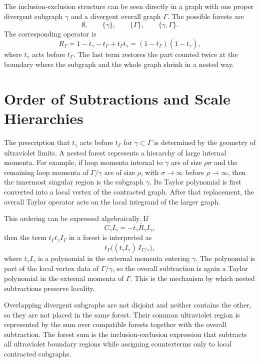 The inclusion-exclusion structure can be seen directly in a graph with one
proper divergent subgraph \(\gamma\) and a divergent overall graph \(\Gamma\).
The possible forests are
\[
  \emptyset,\qquad
  \{\gamma\},\qquad
  \{\Gamma\},\qquad
  \{\gamma,\Gamma\}.
\]
The corresponding operator is
\[
  R_\Gamma
  =
  1-t_\gamma-t_\Gamma+t_\Gamma t_\gamma
  =
  (1-t_\Gamma)(1-t_\gamma),
\]
where \(t_\gamma\) acts before \(t_\Gamma\).  The last term restores the part
counted twice at the boundary where the subgraph and the whole graph shrink in
a nested way.

\section{Order of Subtractions and Scale Hierarchies}

The prescription that \(t_\gamma\) acts before \(t_\Gamma\) for
\(\gamma\subset\Gamma\) is determined by the geometry of ultraviolet limits.  A
nested forest represents a hierarchy of large internal momenta.  For example,
if loop momenta internal to \(\gamma\) are of size \(\rho\sigma\) and the
remaining loop momenta of \(\Gamma/\gamma\) are of size \(\rho\), with
\(\sigma\to\infty\) before \(\rho\to\infty\), then the innermost singular
region is the subgraph \(\gamma\).  Its Taylor polynomial is first converted
into a local vertex of the contracted graph.  After that replacement, the
overall Taylor operator acts on the local integrand of the larger graph.

This ordering can be expressed algebraically.  If
\[
  C_\gamma I_\gamma=-t_\gamma\overline R_\gamma I_\gamma,
\]
then the term \(t_\Gamma t_\gamma I_\Gamma\) in a forest is interpreted as
\[
  t_\Gamma\bigl((t_\gamma I_\gamma)\,I_{\Gamma/\gamma}\bigr),
\]
where \(t_\gamma I_\gamma\) is a polynomial in the external momenta entering
\(\gamma\).  The polynomial is part of the local vertex data of
\(\Gamma/\gamma\), so the overall subtraction is again a Taylor polynomial in
the external momenta of \(\Gamma\).  This is the mechanism by which nested
subtractions preserve locality.

Overlapping divergent subgraphs are not disjoint and neither contains the
other, so they are not placed in the same forest.  Their common ultraviolet
region is represented by the sum over compatible forests together with the
overall subtraction.  The forest sum is the inclusion-exclusion expression that
subtracts all ultraviolet boundary regions while assigning counterterms only
to local contracted subgraphs.

